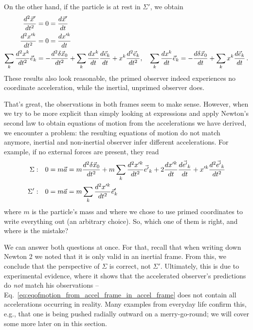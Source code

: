 \documentclass[../class_mech_main.tex]{subfiles}
\begin{document}
\begin{itemize}
	On the other hand, if the particle is at rest in $\Sigma'$, we obtain
	\begin{align*}
		\dv[2]{\vec{x}'}{t} &= 0 = \dv{\vec{x}'}{t}
		\\
		\dv[2]{x'^k}{t} &= 0 = \dv{x'^k}{t}
		\\
		\sum_k \dv[2]{x^k}{t} \vec{e}_k &= -\dv[2]{\delta \vec{x}_0}{t} + \sum_k \dv{x^k}{t} \dv{\vec{e}_k}{t} + x^k \dv[2]{\vec{e}_k}{t},
		\quad \sum_k \dv{x^k}{t} \vec{e}_k = -\dv{\delta \vec{x}_0}{t} + \sum_k x^k \dv{\vec{e}_k}{t} \, .
	\end{align*}
	These results also look reasonable, the primed observer indeed experiences no coordinate acceleration, while the inertial, unprimed observer does.
\end{itemize}

That's great, the observations in both frames seem to make sense. However, when we try to be more explicit than simply looking at expressions and apply Newton's second law to obtain equations of motion from the accelerations we have derived, we encounter a problem: the resulting equations of motion do not match anymore, inertial and non-inertial observer infer different accelerations. For example, if no external forces are present, they read
\begin{align}
	\Sigma: \quad & 0 = m \vec{a} = m \dv[2]{\delta \vec{x}_0}{t} + m \sum_k \dv[2]{x'^k}{t} \vec{e'}_k + 2 \dv{x'^k}{t} \dv{\vec{e'}_k}{t} + x'^k \dv[2]{\vec{e'}_k}{t}
	\label{eq:eqofmotion_from_accel_frame_in_inert_frame}
	\\
	\Sigma': \quad & 0 = m \vec{a} = m \sum_k \dv[2]{x'^k}{t} \vec{e}'_k
	\label{eq:eqofmotion_from_accel_frame_in_accel_frame}
\end{align}
where $m$ is the particle's mass and where we chose to use primed coordinates to write everything out (an arbitrary choice). So, which one of them is right, and where is the mistake?


We can answer both questions at once. For that, recall that when writing down Newton 2 we noted that it is only valid in an inertial frame. From this, we conclude that the perspective of $\Sigma$ is correct, not $\Sigma'$. Ultimately, this is due to experimental evidence, where it shows that the accelerated observer's predictions do \emph{not} match his observations -- Eq.~\eqref{eq:eqofmotion_from_accel_frame_in_accel_frame} does not contain all accelerations occurring in reality. Many examples from everyday life confirm this, e.g., that one is being pushed radially outward on a merry-go-round; we will cover some more later on in this section.
\end{document}
